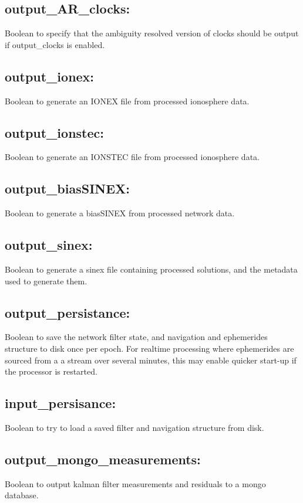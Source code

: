 \subsection*{output\_AR\_clocks:}
Boolean to specify that the ambiguity resolved version of clocks should be output if output\_clocks is enabled.

\subsection*{output\_ionex:}
Boolean to generate an IONEX file from processed ionosphere data.

\subsection*{output\_ionstec:}
Boolean to generate an IONSTEC file from processed ionosphere data.

\subsection*{output\_biasSINEX:}
Boolean to generate a biasSINEX from processed network data.

\subsection*{output\_sinex:}
Boolean to generate a sinex file containing processed solutions, and the metadata used to generate them.

\subsection*{output\_persistance:}
Boolean to save the network filter state, and navigation and ephemerides structure to disk once per epoch. For realtime processing where ephemerides are sourced from a a stream over several minutes, this may enable quicker start-up if the processor is restarted.

\subsection*{input\_persisance:}
Boolean to try to load a saved filter and navigation structure from disk.

\subsection*{output\_mongo\_measurements:}
Boolean to output kalman filter measurements and residuals to a mongo database.

